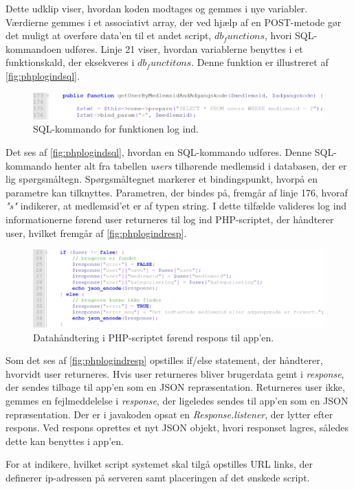 \noindent
Dette udklip viser, hvordan koden modtages og gemmes i nye variabler. Værdierne gemmes i et associativt array, der ved hjælp af en POST-metode gør det muligt at overføre data'en til et andet script, \textit{$db_functions$}, hvori SQL-kommandoen udføres. Linje 21 viser, hvordan variablerne benyttes i et funktionskald, der eksekveres i \textit{$db_functitons$}. Denne funktion er illustreret af \autoref{fig:phplogindsql}.

\begin{figure} [H]
\centering
\includegraphics[width=1\textwidth]{figures/imple/phplogindsql}
\caption{SQL-kommando for funktionen log ind.}
\label{fig:phplogindsql}
\end{figure}

\noindent
Det ses af \autoref{fig:phplogindsql}, hvordan en SQL-kommando udføres. Denne SQL-kommando henter alt fra tabellen \textit{users} tilhørende medlemsid i databasen, der er lig spørgsmåltegn. Spørgsmåltegnet markerer et bindingspunkt, hvorpå en parametre kan tilknyttes. Parametren, der bindes på, fremgår af linje 176, hvoraf \textit{"s"} indikerer, at medlemsid'et er af typen string. I dette tilfælde valideres log ind informationerne førend user returneres til log ind PHP-scriptet, der håndterer user, hvilket fremgår af \autoref{fig:phplogindresp}.


\begin{figure} [H]
\centering
\includegraphics[width=1\textwidth]{figures/imple/phplogindresp}
\caption{Datahåndtering i PHP-scriptet førend respons til app'en.}
\label{fig:phplogindresp}
\end{figure}


\noindent
Som det ses af \autoref{fig:phplogindresp} opstilles if/else statement, der håndterer, hvorvidt user returneres. Hvis user returneres bliver brugerdata gemt i \textit{response}, der sendes tilbage til app'en som en JSON repræsentation. Returneres user ikke, gemmes en fejlmeddelelse i \textit{response}, der ligeledes sendes til app'en som en JSON repræsentation. 
Der er i javakoden opsat en \textit{Response.listener}, der lytter efter respons. Ved respons oprettes et nyt JSON objekt, hvori responset lagres, således dette kan benyttes i app'en. 






For at indikere, hvilket script systemet skal tilgå opstilles URL links, der definerer ip-adressen på serveren samt placeringen af det ønskede script.

